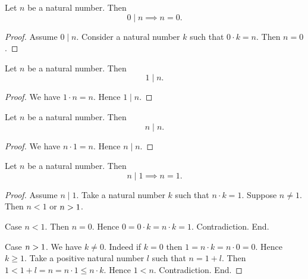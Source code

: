 \documentclass[../arithmetic.tex]{subfiles}
\begin{document}
  \begin{forthel}
    \begin{proposition}
      Let $n$ be a natural number.
      Then \[ 0 \mid n \implies n = 0. \]
    \end{proposition}
    \begin{proof}
      Assume $0 \mid n$.
      Consider a natural number $k$ such that $0 \cdot k = n$.
      Then $n = 0$.
    \end{proof}
  \end{forthel}

  \begin{forthel}
    \begin{proposition}
      Let $n$ be a natural number.
      Then \[ 1 \mid n. \]
    \end{proposition}
    \begin{proof}
      We have $1 \cdot n = n$.
      Hence $1 \mid n$.
    \end{proof}
  \end{forthel}

  \begin{forthel}
    \begin{proposition}
      Let $n$ be a natural number.
      Then \[ n \mid n. \]
    \end{proposition}
    \begin{proof}
      We have $n \cdot 1 = n$.
      Hence $n \mid n$.
    \end{proof}
  \end{forthel}

  \begin{forthel}
    \begin{proposition}
      Let $n$ be a natural number.
      Then \[ n \mid 1 \implies n = 1. \]
    \end{proposition}
    \begin{proof}
      Assume $n \mid 1$.
      Take a natural number $k$ such that $n \cdot k = 1$.
      Suppose $n \neq 1$.
      Then $n \less 1$ or $n > 1$.

      Case $n \less 1$.
        Then $n = 0$.
        Hence $0
          = 0 \cdot k
          = n \cdot k
          = 1$.
        Contradiction.
      End.

      Case $n > 1$.
        We have $k \neq 0$.
        Indeed if $k = 0$ then
        $1
          = n \cdot k
          = n \cdot 0
          = 0$.
        Hence $k \geq 1$.
        Take a positive natural number $l$ such that $n = 1 \plus l$.
        Then $1
          \less 1 \plus l
          = n
          = n \cdot 1
          \leq n \cdot k$.
        Hence $1 \less n$.
        Contradiction.
      End.
    \end{proof}
  \end{forthel}
\end{document}
